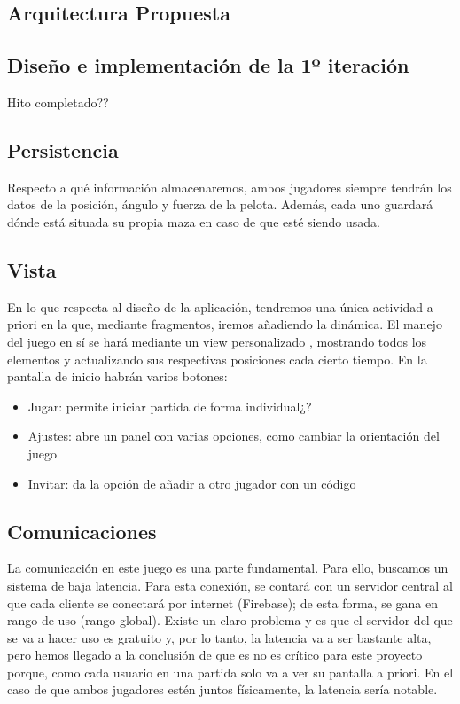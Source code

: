 \documentclass[a4paper,openright,12pt]{article}
\begin{document}
\subsection{Arquitectura Propuesta}

\subsection{Diseño e implementación de la 1º iteración}
Hito completado??


\subsection{Persistencia}
Respecto a qué información almacenaremos, ambos jugadores siempre tendrán los datos de la posición, ángulo y fuerza de la pelota. Además, cada uno guardará dónde está situada su propia maza en caso de que esté siendo usada.

\subsection{Vista}
En lo que respecta al diseño de la aplicación, tendremos una única actividad a priori en la que, mediante fragmentos, iremos añadiendo la dinámica. El manejo del juego en sí se hará mediante un view personalizado , mostrando todos los elementos y actualizando sus respectivas posiciones cada cierto tiempo. 
En la pantalla de inicio habrán varios botones:
\begin{itemize}
    \item Jugar: permite iniciar partida de forma individual¿?
    \item Ajustes: abre un panel con varias opciones, como cambiar la orientación del juego
    \item Invitar: da la opción de añadir a otro jugador con un código
\end{itemize}


\subsection{Comunicaciones}
La comunicación en este juego es una parte fundamental. Para ello, buscamos un sistema de baja latencia. Para esta conexión, se contará con un servidor central al que cada cliente se conectará por internet (Firebase); de esta forma, se gana en rango de uso (rango global). Existe un claro problema y es que el servidor del que se va a hacer uso es gratuito y, por lo tanto, la latencia va a ser bastante alta, pero hemos llegado a la conclusión de que es no es crítico para este proyecto porque, como cada usuario en una partida solo va a ver su pantalla a priori. En el caso de que ambos jugadores estén juntos físicamente, la latencia sería notable.
\end{document}
